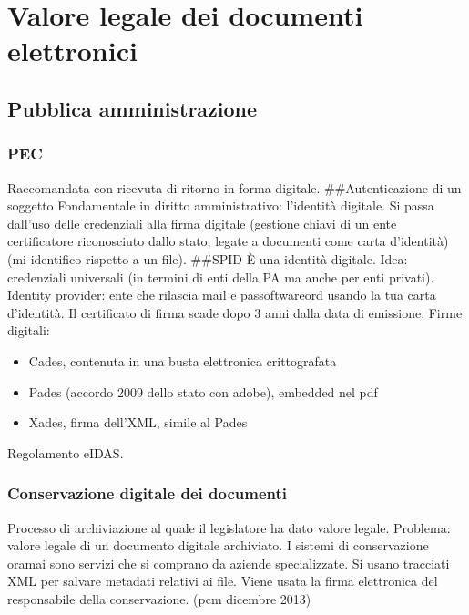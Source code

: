 \chapter{Valore legale dei documenti elettronici}

\section{Pubblica amministrazione}

\subsection{PEC}

Raccomandata con ricevuta di ritorno in forma digitale.
\#\#Autenticazione di un soggetto Fondamentale in diritto
amministrativo: l'identità digitale. Si passa dall'uso delle credenziali
alla firma digitale (gestione chiavi di un ente certificatore
riconosciuto dallo stato, legate a documenti come carta d'identità) (mi
identifico rispetto a un file). \#\#SPID È una identità digitale. Idea:
credenziali universali (in termini di enti della PA ma anche per enti
privati). Identity provider: ente che rilascia mail e passoftwareord usando la
tua carta d'identità. Il certificato di firma scade dopo 3 anni dalla
data di emissione. Firme digitali:

\begin{itemize}
\item
  Cades, contenuta in una busta elettronica crittografata
\item
  Pades (accordo 2009 dello stato con adobe), embedded nel pdf
\item
  Xades, firma dell'XML, simile al Pades
\end{itemize}

Regolamento eIDAS.

\subsection{Conservazione digitale dei
documenti}

Processo di archiviazione al quale il legislatore ha dato valore legale.
Problema: valore legale di un documento digitale archiviato. I sistemi
di conservazione oramai sono servizi che si comprano da aziende
specializzate. Si usano tracciati XML per salvare metadati relativi ai
file. Viene usata la firma elettronica del responsabile della
conservazione. (pcm dicembre 2013)

